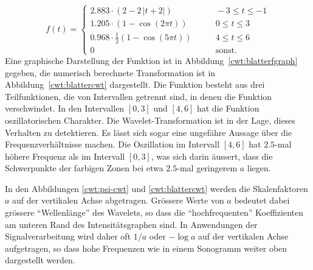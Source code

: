 \begin{beispiel}
\begin{equation}
f(t) = \begin{cases}
2.883 \cdot (2 - 2\,|t+2|)&\qquad -3\le t \le -1\\
1.205\cdot (1-\cos(2\pi t))&\qquad 0\le t \le 3\\
0.968\cdot \frac12(1-\cos(5\pi t))&\qquad 4\le t \le 6\\
0&\qquad\text{sonst.}
\end{cases}
\label{cwt:blatterf}
\end{equation}
Eine graphische Darstellung der Funktion ist in
Abbildung~\ref{cwt:blatterfgraph} gegeben,
die numerisch berechnete Transformation ist in Abbildung~\ref{cwt:blattercwt}
dargestellt.
Die Funktion besteht aus drei Teilfunktionen, die von Intervallen getrennt sind,
in denen die Funktion verschwindet.
In den Intervallen $[0,3]$ und $[4,6]$ hat die Funktion oszillatorischen
Charakter.
Die Wavelet-Transformation ist in der Lage, dieses Verhalten zu detektieren.
Es lässt sich sogar eine ungefähre Aussage über die Frequenzverhältnisse
machen.
Die Oszillation im Intervall $[4,6]$ hat $2.5$-mal höhere Frequenz als im
Intervall $[0,3]$, was sich darin äussert, dass die Schwerpunkte der farbigen
Zonen bei etwa $2.5$-mal geringerem $a$ liegen.
\end{beispiel}

In den Abbildungen \ref{cwt:psi-cwt} und \ref{cwt:blattercwt} werden 
die Skalenfaktoren $a$ auf der vertikalen Achse abgetragen.
Grössere Werte von $a$ bedeutet dabei grössere ``Wellenlänge'' des Wavelets,
so dass die ``hochfrequenten'' Koeffizienten am unteren Rand des
Intensitätsgraphen sind.
In Anwendungen der Signalverarbeitung wird daher oft $1/a$ oder $-\log a$ 
auf der vertikalen Achse aufgetragen, so dass hohe Frequenzen wie in
einem Sonogramm weiter oben dargestellt werden.

